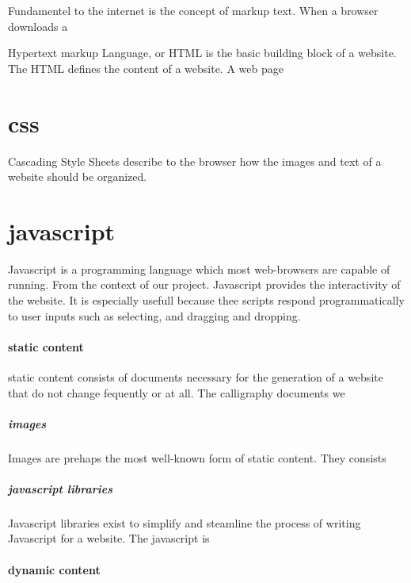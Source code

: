 Fundamentel to the internet is the concept of markup text.  When a browser downloads a 

Hypertext markup Language, or HTML is the basic building block of a website.  The HTML defines the content of a website.  A web page 

\chapter{css}

Cascading Style Sheets describe to the browser how the images and text of a website should be organized.  

\chapter{javascript}

Javascript is a programming language which most web-browsers are capable of running.  From the context of our project.  Javascript provides the interactivity of the website.  It is especially usefull because thee scripts respond programmatically to user inputs such as selecting, and dragging and dropping.  






\subsubsection{static content}

static content consists of documents necessary for the generation of a website that do not change fequently or at all.  The calligraphy documents we 

\paragraph{images}

Images are prehaps the most well-known form of static content.  They consists

\paragraph{javascript libraries}

Javascript libraries exist to simplify and steamline the process of writing Javascript for a website.  The javascript is 

\subsubsection{dynamic content}


